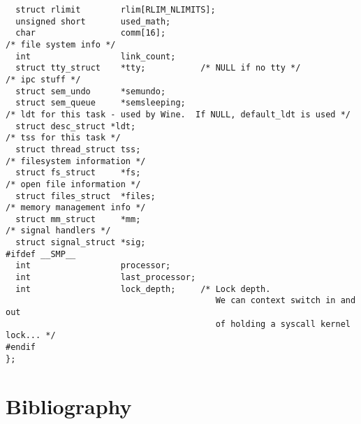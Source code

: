 \documentclass[10pt,letterpaper,onecolumn,draftclsnofoot]{IEEEtran}
\begin{document}
\begin{lstlisting}
  struct rlimit        rlim[RLIM_NLIMITS];
  unsigned short       used_math;
  char                 comm[16];
/* file system info */
  int                  link_count;
  struct tty_struct    *tty;           /* NULL if no tty */
/* ipc stuff */
  struct sem_undo      *semundo;
  struct sem_queue     *semsleeping;
/* ldt for this task - used by Wine.  If NULL, default_ldt is used */
  struct desc_struct *ldt;
/* tss for this task */
  struct thread_struct tss;
/* filesystem information */
  struct fs_struct     *fs;
/* open file information */
  struct files_struct  *files;
/* memory management info */
  struct mm_struct     *mm;
/* signal handlers */
  struct signal_struct *sig;
#ifdef __SMP__
  int                  processor;
  int                  last_processor;
  int                  lock_depth;     /* Lock depth.
                                          We can context switch in and out
                                          of holding a syscall kernel lock... */
#endif
};
\end{lstlisting}
\clearpage
\section{Bibliography}



\end{document}
